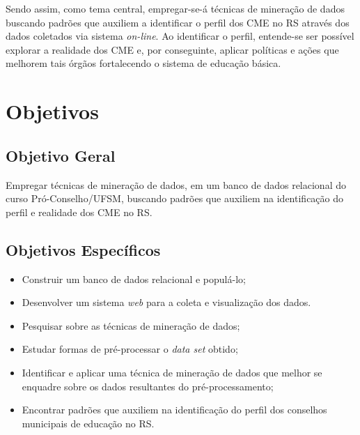 \documentclass[projtg]{mdtufsm}
\begin{document}
Sendo assim, como tema central, empregar-se-á técnicas de mineração de dados buscando padrões que auxiliem a identificar o perfil dos CME no RS através dos dados coletados via sistema {\it on-line}. Ao identificar o perfil, entende-se ser possível explorar a realidade dos CME e, por conseguinte, aplicar políticas e ações que melhorem tais órgãos fortalecendo o sistema de educação básica.



\chapter{Objetivos}
\section{Objetivo Geral}

Empregar técnicas de mineração de dados, em um banco de dados relacional do curso Pró-Conselho/UFSM, buscando padrões que auxiliem na identificação do perfil e realidade dos CME no RS.
	
\section{Objetivos Específicos}
\begin{itemize}
  \item Construir um banco de dados relacional e populá-lo;
  \item Desenvolver um sistema {\it web} para a coleta e visualização dos dados.
  \item Pesquisar sobre as técnicas de mineração de dados;
  \item Estudar formas de pré-processar o \textit{data set} obtido;
  \item Identificar e aplicar uma técnica de mineração de dados que melhor se enquadre sobre os dados resultantes do pré-processamento;
  \item Encontrar padrões que auxiliem na identificação do perfil dos conselhos municipais de educação no RS.
\end{itemize}
\end{document}
